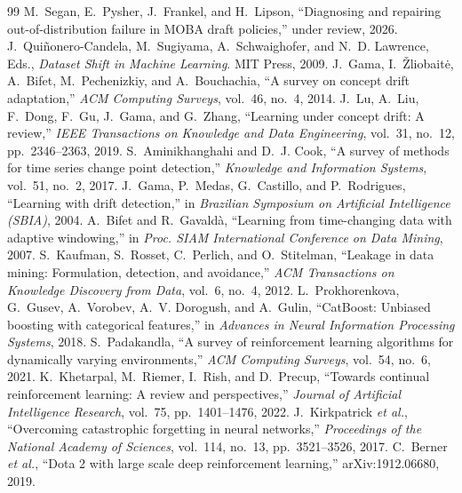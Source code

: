 \documentclass[journal]{IEEEtran}
\newif\ifanonymous
\begin{document}
\begin{thebibliography}{99}
 \ifanonymous Anonymous authors\else M.~Segan,
E.~Pysher, J.~Frankel, and H.~Lipson\fi, ``Diagnosing and repairing
out-of-distribution failure in MOBA draft policies,'' under review,
2026.
 J.~Qui\~nonero-Candela, M.~Sugiyama,
A.~Schwaighofer, and N.~D. Lawrence, Eds., \emph{Dataset Shift in
Machine Learning}. MIT Press, 2009.
 J.~Gama, I.~\v{Z}liobait\.{e}, A.~Bifet,
M.~Pechenizkiy, and A.~Bouchachia, ``A survey on concept drift
adaptation,'' \emph{ACM Computing Surveys}, vol.~46, no.~4, 2014.
 J.~Lu, A.~Liu, F.~Dong, F.~Gu, J.~Gama, and
G.~Zhang, ``Learning under concept drift: A review,'' \emph{IEEE
Transactions on Knowledge and Data Engineering}, vol.~31, no.~12,
pp.~2346--2363, 2019.
 S.~Aminikhanghahi and D.~J. Cook,
``A survey of methods for time series change point detection,''
\emph{Knowledge and Information Systems}, vol.~51, no.~2, 2017.
 J.~Gama, P.~Medas, G.~Castillo, and P.~Rodrigues,
``Learning with drift detection,'' in \emph{Brazilian Symposium on
Artificial Intelligence (SBIA)}, 2004.
 A.~Bifet and R.~Gavald\`a, ``Learning from
time-changing data with adaptive windowing,'' in \emph{Proc. SIAM
International Conference on Data Mining}, 2007.
 S.~Kaufman, S.~Rosset, C.~Perlich, and
O.~Stitelman, ``Leakage in data mining: Formulation, detection, and
avoidance,'' \emph{ACM Transactions on Knowledge Discovery from Data},
vol.~6, no.~4, 2012.
 L.~Prokhorenkova, G.~Gusev,
A.~Vorobev, A.~V. Dorogush, and A.~Gulin, ``CatBoost: Unbiased boosting
with categorical features,'' in \emph{Advances in Neural Information
Processing Systems}, 2018.
 S.~Padakandla, ``A survey of
reinforcement learning algorithms for dynamically varying
environments,'' \emph{ACM Computing Surveys}, vol.~54, no.~6, 2021.
 K.~Khetarpal, M.~Riemer, I.~Rish, and
D.~Precup, ``Towards continual reinforcement learning: A review and
perspectives,'' \emph{Journal of Artificial Intelligence Research},
vol.~75, pp.~1401--1476, 2022.
 J.~Kirkpatrick \emph{et al.}, ``Overcoming
catastrophic forgetting in neural networks,'' \emph{Proceedings of the
National Academy of Sciences}, vol.~114, no.~13, pp.~3521--3526, 2017.
 C.~Berner \emph{et al.}, ``Dota 2 with large
scale deep reinforcement learning,'' arXiv:1912.06680, 2019.

\end{thebibliography}
\end{document}
